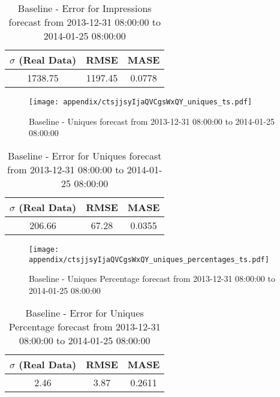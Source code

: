 \begin{table}[H]
\centering
\footnotesize
\begin{tabular}{ccc}
$\sigma$ (Real Data) & RMSE & MASE   \\ \hline
1738.75 & 1197.45 & 0.0778 \\
\end{tabular}

\vspace{0.5cm}

\caption{
Baseline - Error for Impressions forecast from 2013-12-31 08:00:00 to 2014-01-25 08:00:00}
\end{table}

\begin{figure}[H] \begin{center} \leavevmode
\texttt{[image: appendix/ctsjjsyIjaQVCgsWxQY\_uniques\_ts.pdf]} \caption{
Baseline - Uniques forecast from 2013-12-31 08:00:00 to 2014-01-25 08:00:00} \label{fig:appendix/ctsjjsyIjaQVCgsWxQY_uniques_ts.pdf} \end{center}
\end{figure}

\begin{table}[H]
\centering
\footnotesize
\begin{tabular}{ccc}
$\sigma$ (Real Data) & RMSE & MASE   \\ \hline
206.66 & 67.28 & 0.0355 \\
\end{tabular}

\vspace{0.5cm}

\caption{
Baseline - Error for Uniques forecast from 2013-12-31 08:00:00 to 2014-01-25 08:00:00}
\end{table}

\begin{figure}[H] \begin{center} \leavevmode
\texttt{[image: appendix/ctsjjsyIjaQVCgsWxQY\_uniques\_percentages\_ts.pdf]} \caption{
Baseline - Uniques Percentage forecast from 2013-12-31 08:00:00 to 2014-01-25 08:00:00} \label{fig:appendix/ctsjjsyIjaQVCgsWxQY_uniques_percentages_ts.pdf} \end{center}
\end{figure}

\begin{table}[H]
\centering
\footnotesize
\begin{tabular}{ccc}
$\sigma$ (Real Data) & RMSE & MASE   \\ \hline
2.46 & 3.87 & 0.2611 \\
\end{tabular}

\vspace{0.5cm}

\caption{
Baseline - Error for Uniques Percentage forecast from 2013-12-31 08:00:00 to 2014-01-25 08:00:00}
\end{table}

